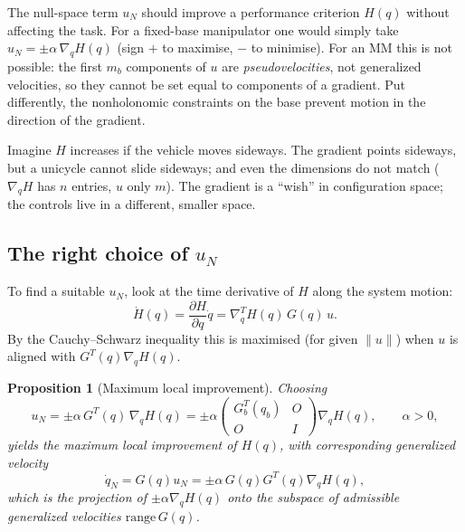 \documentclass[11pt,a4paper]{article}
\def\bm#1{#1}%
\newcommand{\qbase}{\bm{q}_b}
\newcommand{\Gbase}{\bm{G}_b}
\newcommand{\grad}{\nabla_{\!\bm{q}}}
\theoremstyle{definition}
\theoremstyle{plain}
\newtheorem{proposition}[definition]{Proposition}
\theoremstyle{remark}
\begin{document}
The null-space term $\bm u_N$ should improve a performance criterion $H(\bm q)$ without affecting the task. For a fixed-base manipulator one would simply take $\bm u_N=\pm\alpha\,\grad H(\bm q)$ (sign $+$ to maximise, $-$ to minimise). For an MM this is not possible: the first $m_b$ components of $\bm u$ are \emph{pseudovelocities}, not generalized velocities, so they cannot be set equal to components of a gradient. Put differently, the nonholonomic constraints on the base prevent motion in the direction of the gradient.

\begin{intuition}
Imagine $H$ increases if the vehicle moves sideways. The gradient points sideways, but a unicycle cannot slide sideways; and even the dimensions do not match ($\grad H$ has $n$ entries, $\bm u$ only $m$). The gradient is a ``wish'' in configuration space; the controls live in a different, smaller space.
\end{intuition}

\subsection{The right choice of \texorpdfstring{$\bm u_N$}{uN}}

To find a suitable $\bm u_N$, look at the time derivative of $H$ along the system motion:
\[
\dot H(\bm q)=\frac{\partial H}{\partial\bm q}\dot{\bm q}=\grad^{\!T}H(\bm q)\,\bm G(\bm q)\,\bm u .
\]
By the Cauchy--Schwarz inequality this is maximised (for given $\|\bm u\|$) when $\bm u$ is aligned with $\bm G^T(\bm q)\grad H(\bm q)$.

\begin{proposition}[Maximum local improvement]\label{prop:uN}
Choosing
\[
\bm u_N=\pm\alpha\,\bm G^T(\bm q)\,\grad H(\bm q)=\pm\alpha\begin{pmatrix}\Gbase^T(\qbase)&\bm O\\ \bm O&\bm I\end{pmatrix}\grad H(\bm q),\qquad\alpha>0,
\]
yields the maximum local improvement of $H(\bm q)$, with corresponding generalized velocity
\[
\dot{\bm q}_N=\bm G(\bm q)\bm u_N=\pm\alpha\,\bm G(\bm q)\bm G^T(\bm q)\grad H(\bm q),
\]
which is the projection of $\pm\alpha\grad H(\bm q)$ onto the subspace of admissible generalized velocities $\mathrm{range}\,\bm G(\bm q)$.
\end{proposition}
\end{document}
